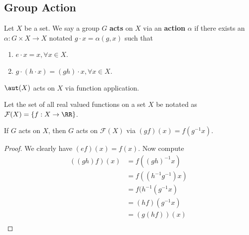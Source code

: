 \subsection{Group Action}

\begin{df}
Let $X$ be a set. We say a group $G$ \textbf{acts} on $X$ via an
\textbf{action} $\alpha$ if there exists an $\alpha : G \times X \to X$
notated $g \cdot x = \alpha(g, x)$ such that
\begin{enumerate}
\item $e \cdot x = x, \forall x \in X$.
\item $g \cdot (h \cdot x) = (gh) \cdot x, \forall x \in X$.
\end{enumerate}
\end{df}

\begin{ex}
$\aut(X)$ acts on $X$ via function application.
\end{ex}

\begin{df}
Let the set of all real valued functions on a set $X$ be notated as
$\mathcal{F}(X) = \lbrace f : X \to \RR \rbrace$.
\end{df}

\begin{ex}
If $G$ acts on $X$, then $G$ acts on $\mathcal{F}(X)$ via $(gf)(x) =
f(g^{-1}x)$.
\end{ex}

\begin{proof}
We clearly have $(ef)(x) = f(x)$. Now compute
\[ \begin{aligned}
((gh)f)(x) &= f((gh)^{-1}x) \\
&= f((h^{-1}g^{-1})x) \\
&= f(h^{-1}(g^{-1}x) \\
&= (hf)(g^{-1}x) \\
&= (g(hf))(x) \\
\end{aligned} \]
\end{proof}
